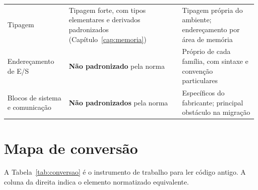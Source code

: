 \begin{table}[H]
\begin{tabular}{p{3.0cm} p{5.6cm} p{6.0cm}}
    Tipagem
      & Tipagem forte, com tipos elementares e derivados padronizados (Capítulo~\ref{cap:memoria})
      & Tipagem própria do ambiente; endereçamento por área de memória \\
    \addlinespace
    Endereçamento de E/S
      & \textbf{Não padronizado} pela norma
      & Próprio de cada família, com sintaxe e convenção particulares \\
    \addlinespace
    Blocos de sistema e comunicação
      & \textbf{Não padronizados} pela norma
      & Específicos do fabricante; principal obstáculo na migração \\
    \bottomrule
  \end{tabular}
\end{table}

\section{Mapa de conversão}

A Tabela~\ref{tab:conversao} é o instrumento de trabalho para ler código antigo. A coluna da direita
indica o elemento normatizado equivalente.

